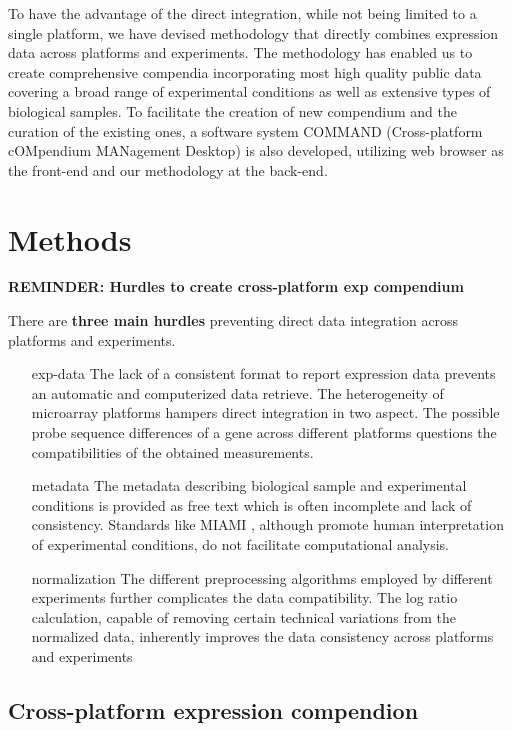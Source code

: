To have the advantage of the direct integration, while not being limited to a
single platform, we have devised methodology that directly combines expression
data across platforms and experiments.
%
The methodology has enabled us to create comprehensive compendia incorporating
most high quality public data covering a broad range of experimental conditions
as well as extensive types of biological samples.
%
To facilitate the creation of new compendium and the curation of the existing
ones, a software system COMMAND (Cross-platform cOMpendium MANagement Desktop)
is also developed, utilizing web browser as the front-end and our methodology
at the back-end.




\section{Methods}


\textbf{REMINDER: Hurdles to create cross-platform exp compendium}

There are \textbf{three main hurdles} preventing direct data integration across
platforms and experiments.
%
\begin{itemize}
%
\item[exp-data] The lack of a consistent format to report expression data
  prevents an automatic and computerized data retrieve.
%
  The heterogeneity of microarray platforms hampers direct integration in two
  aspect.  The possible probe sequence differences of a gene across different
  platforms questions the compatibilities of the obtained measurements.
%
\item[metadata] The metadata describing biological sample and experimental
  conditions is provided as free text which is often incomplete and lack of
  consistency.  Standards like MIAMI \cite{Brazma2001, Brazma2009}, although
  promote human interpretation of experimental conditions, do not facilitate
  computational analysis.
%
\item[normalization] The different preprocessing algorithms employed by
  different experiments further complicates the data compatibility.
%
  The log ratio calculation, capable of removing certain technical variations
  from the normalized data, inherently improves the data consistency across
  platforms and experiments \cite{Shi2006, Shi2008}
%
\end{itemize}



\subsection{Cross-platform expression compendion}

